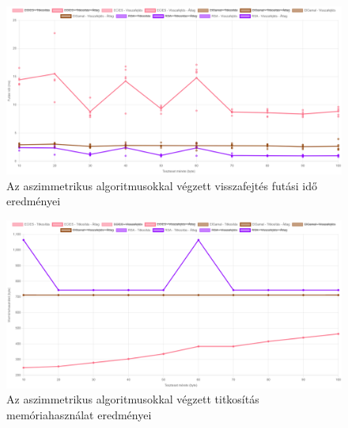 \documentclass[12pt]{report} %
\begin{document}
\begin{figure}[H]
    \centering %
    \includegraphics[width=\textwidth]{Figures/AsymmetricDecryptionRunTime.png} %
    \caption{Az aszimmetrikus algoritmusokkal végzett visszafejtés futási idő eredményei} %
    \label{fig:AsymmetricDecryptionRunTime} %
\end{figure}

\begin{figure}[H]
    \centering %
    \includegraphics[width=\textwidth]{Figures/AsymmetricEncryptionMemoryUsage.png} %
    \caption{Az aszimmetrikus algoritmusokkal végzett titkosítás memóriahasználat eredményei} %
    \label{fig:AsymmetricEncryptionMemoryUsage} %
\end{figure}
\end{document}
